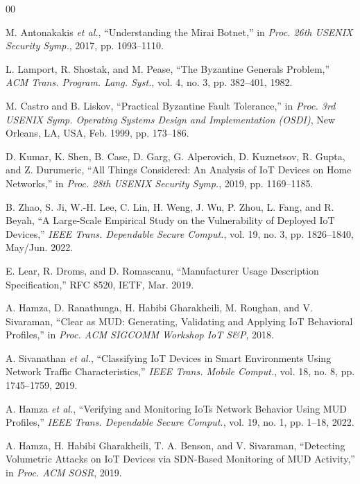 \documentclass[journal]{IEEEtran}
\theoremstyle{definition}
\begin{document}
\begin{thebibliography}{00}

 M. Antonakakis \emph{et al.}, ``Understanding the Mirai Botnet,'' in
\emph{Proc. 26th USENIX Security Symp.}, 2017, pp. 1093--1110.

 L. Lamport, R. Shostak, and M. Pease, ``The Byzantine Generals Problem,'' \emph{ACM Trans. Program. Lang. Syst.}, vol. 4, no. 3, pp. 382--401, 1982.

 M. Castro and B. Liskov, ``Practical Byzantine Fault Tolerance,'' in \emph{Proc. 3rd USENIX Symp. Operating Systems Design and Implementation (OSDI)}, New Orleans, LA, USA, Feb. 1999, pp. 173--186.

 D. Kumar, K. Shen, B. Case, D. Garg, G. Alperovich, D. Kuznetsov, R. Gupta, and Z. Durumeric, ``All Things Considered: An Analysis of IoT Devices on Home Networks,'' in \emph{Proc. 28th USENIX Security Symp.}, 2019, pp. 1169--1185.

 B. Zhao, S. Ji, W.-H. Lee, C. Lin, H. Weng, J. Wu, P. Zhou, L. Fang, and R. Beyah, ``A Large-Scale Empirical Study on the Vulnerability of Deployed IoT Devices,'' \emph{IEEE Trans. Dependable Secure Comput.}, vol. 19, no. 3, pp. 1826--1840, May/Jun. 2022.

 E. Lear, R. Droms, and D. Romascanu, ``Manufacturer Usage Description
Specification,'' RFC 8520, IETF, Mar. 2019.

 A. Hamza, D. Ranathunga, H. Habibi Gharakheili, M. Roughan, and
V. Sivaraman, ``Clear as MUD: Generating, Validating and Applying IoT Behavioral
Profiles,'' in \emph{Proc. ACM SIGCOMM Workshop IoT S\&P}, 2018.

 A. Sivanathan \emph{et al.}, ``Classifying IoT Devices
in Smart Environments Using Network Traffic Characteristics,'' \emph{IEEE Trans. Mobile
Comput.}, vol. 18, no. 8, pp. 1745--1759, 2019.

 A. Hamza \emph{et al.}, ``Verifying and Monitoring IoTs Network
Behavior Using MUD Profiles,'' \emph{IEEE Trans. Dependable Secure Comput.}, vol. 19, no.
1, pp. 1--18, 2022.

 A. Hamza, H. Habibi Gharakheili, T. A. Benson, and V. Sivaraman,
``Detecting Volumetric Attacks on IoT Devices via SDN-Based Monitoring of MUD Activity,''
in \emph{Proc. ACM SOSR}, 2019.


\end{thebibliography}
\end{document}
